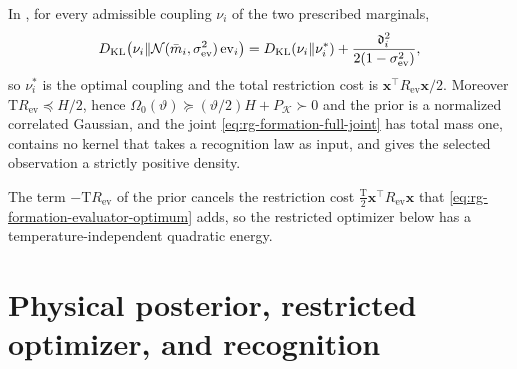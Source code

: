 In , for every admissible coupling
\(\nu_i\) of the two prescribed marginals,
\begin{equation}
D_{\mathrm{KL}}\bigl(\nu_i\Vert
  \mathcal N(\bar m_i,\sigma^2_{\mathrm{ev}})\operatorname{ev}_i\bigr)
=D_{\mathrm{KL}}(\nu_i\Vert\nu_i^*)+\frac{\mathfrak d_i^2}{2(1-\sigma^2_{\mathrm{ev}})},
\label{eq:rg-formation-evaluator-optimum}
\end{equation}
so \(\nu_i^*\) is the optimal coupling and the total restriction cost is
\(\mathbf x^\top R_{\mathrm{ev}}\mathbf x/2\). Moreover
\(\mathrm TR_{\mathrm{ev}}\preceq H/2\), hence
\(\Omega_0(\vartheta)\succeq(\vartheta/2)H+P_{\mathcal K}\succ0\) and the prior
is a normalized correlated Gaussian, and the joint
\cref{eq:rg-formation-full-joint} has total mass one, contains no kernel that
takes a recognition law as input, and gives the selected observation a
strictly positive density. 

The term \(-\mathrm TR_{\mathrm{ev}}\) of the prior cancels the restriction
cost \(\tfrac{\mathrm T}2\mathbf x^\top R_{\mathrm{ev}}\mathbf x\) that
\cref{eq:rg-formation-evaluator-optimum} adds, so the restricted optimizer
below has a temperature-independent quadratic energy.

\section{Physical posterior, restricted optimizer, and recognition}
\label{sec:rg-formation-laws}

